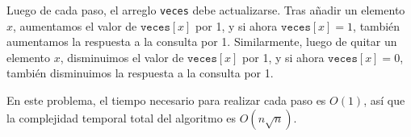 Luego de cada paso, el arreglo \texttt{veces} debe actualizarse. Tras
añadir un elemento $x$, aumentamos el valor de $\texttt{veces}[x]$ por 1,
y si ahora $\texttt{veces}[x]=1$, también aumentamos la respuesta
a la consulta por 1. Similarmente, luego de quitar un elemento $x$,
disminuimos el valor de $\texttt{veces}[x]$ por 1, y si
ahora $\texttt{veces}[x]=0$, también disminuimos la respuesta
a la consulta por 1.

En este problema, el tiempo necesario para realizar cada paso es $O(1)$,
así que la complejidad temporal total del algoritmo es $O(n \sqrt n)$.